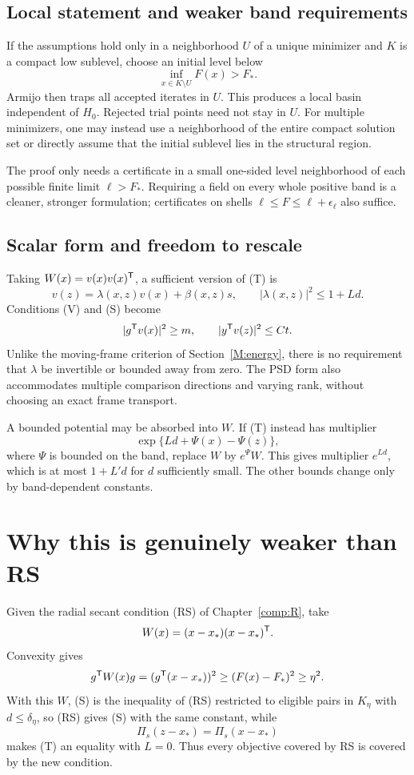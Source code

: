 

\subsection{Local statement and weaker band requirements}
If the assumptions hold only in a neighborhood $U$ of a unique minimizer and $K$ is a compact low sublevel, choose an initial level below
\[
 \inf_{x\in K\setminus U}F(x)>F_*.
\]
Armijo then traps all accepted iterates in $U$. This produces a local basin independent of $H_0$. Rejected trial points need not stay in $U$. For multiple minimizers, one may instead use a neighborhood of the entire compact solution set or directly assume that the initial sublevel lies in the structural region.

The proof only needs a certificate in a small one-sided level neighborhood of each possible finite limit $\ell>F_*$. Requiring a field on every whole positive band is a cleaner, stronger formulation; certificates on shells $\ell\le F\le\ell+\epsilon_\ell$ also suffice.



\subsection{Scalar form and freedom to rescale}
Taking $W(x)=v(x)v(x)^{\mathsf T}$, a sufficient version of (T) is
\[
 v(z)=\lambda(x,z)v(x)+\beta(x,z)s,\qquad
 |\lambda(x,z)|^2\le1+L d.
\]
Conditions (V) and (S) become
\[
 |g^{\mathsf T} v(x)|^2\ge m,\qquad |y^{\mathsf T} v(z)|^2\le Ct.
\]
Unlike the moving-frame criterion of Section~\ref{M:energy}, there is no requirement that $\lambda$ be invertible or bounded away from zero. The PSD form also accommodates multiple comparison directions and varying rank, without choosing an exact frame transport.

A bounded potential may be absorbed into $W$. If (T) instead has multiplier
\[
 \exp\{L d+\Psi(x)-\Psi(z)\},
\]
where $\Psi$ is bounded on the band, replace $W$ by $e^{\Psi}W$. This gives multiplier $e^{Ld}$, which is at most $1+L'd$ for $d$ sufficiently small. The other bounds change only by band-dependent constants.


\setcounter{section}{3}
\setcounter{theorem}{1}
\setcounter{lemma}{0}
\setcounter{corollary}{0}
\setcounter{proposition}{0}
\setcounter{remark}{0}
\setcounter{equation}{6}


\section{Why this is genuinely weaker than RS}
Given the radial secant condition (RS) of Chapter~\ref{comp:R}, take
\[
 W(x)=(x-x_*)(x-x_*)^{\mathsf T}.
\]
Convexity gives
\[
 g^{\mathsf T} W(x)g=(g^{\mathsf T}(x-x_*))^2\ge(F(x)-F_*)^2\ge\eta^2.
\]
With this $W$, (S) is the inequality of (RS) restricted to eligible pairs in $K_\eta$ with $d\le\delta_\eta$, so (RS) gives (S) with the same constant, while
\[
 \Pi_s(z-x_*)=\Pi_s(x-x_*)
\]
makes (T) an equality with $L=0$. Thus every objective covered by RS is covered by the new condition.

